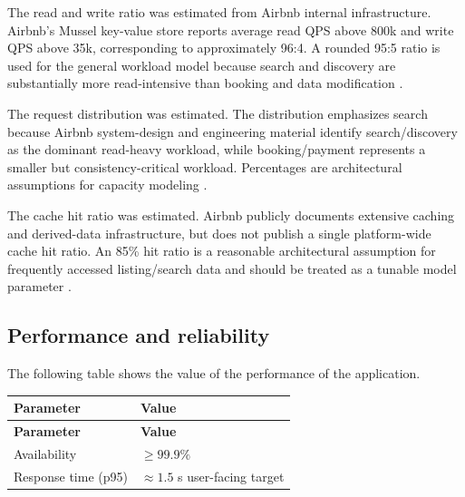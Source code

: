 The read and write ratio was estimated from Airbnb internal infrastructure. Airbnb's Mussel key-value store reports 
average read QPS above 800k and write QPS above 35k, corresponding to approximately 96:4. A rounded 95:5 ratio 
is used for the general workload model because search and discovery are substantially more read-intensive than 
booking and data modification \cite{airbnb_engineering_mussel}. 

The request distribution was estimated. The distribution emphasizes search because Airbnb system-design and engineering
material identify search/discovery as the dominant read-heavy workload, while booking/payment represents a smaller 
but consistency-critical workload. Percentages are architectural assumptions for capacity modeling 
\cite{educative_airbnb_system_design}.

The cache hit ratio was estimated. Airbnb publicly documents extensive caching and derived-data infrastructure, 
but does not publish a single platform-wide cache hit ratio. An 85\% hit ratio is a reasonable architectural assumption 
for frequently accessed listing/search data and should be treated as a tunable model parameter 
\cite{educative_airbnb_system_design}.


\subsection{Performance and reliability}

The following table shows the value of the performance of the application.

\begin{longtable}{|p{}|p{}|}
    \hline
    \textbf{Parameter} & 
    \textbf{Value} \\
    \hline
    \endfirsthead

    \hline
    \textbf{Parameter} & 
    \textbf{Value} \\
    \hline
    \endhead

    Availability & 
    $\geq 99.9\%$ \cite{airbnb_engineering_mussel} \\ 
    \hline 
    
    Response time (p95) & 
    $\approx 1.5$ s user-facing target \cite{airbnb_engineering_mussel,educative_airbnb_system_design} \\ 
    \hline 
    
\end{longtable}

